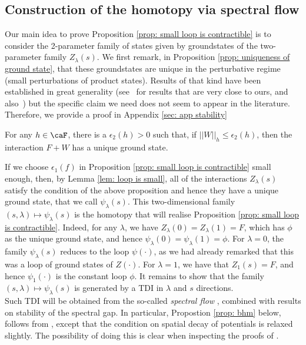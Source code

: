 \subsection{Construction of the homotopy via spectral flow}\label{sec: homotopy from spectral flow}
Our main idea to prove Proposition \ref{prop: small loop is contractible} is to consider the 2-parameter family of states given by  groundstates of the two-parameter family $Z_\lambda(s)$. We first remark, in Proposition \ref{prop: uniqueness of ground state}, that these groundstates are unique in the perturbative regime (small perturbations of product states). Results of that kind have been established in great generality (see~\cite{nachtergaele2020quasi} for results that are very close to ours, and also~\cite{yarotsky2006ground,bravyi2010topological,michalakis2013stability, roeck2017exponentially,del2021lie}) but the specific claim we need does not seem to appear in the literature. Therefore, we provide a proof in Appendix \ref{sec: app stability}
\begin{proposition}\label{prop: uniqueness of ground state}
	For any $h\in\caF$, there is a $\epsilon_2(h)>0$ such that, if $||W||_h \leq \epsilon_2(h)$, then 
	the interaction $F+W$ has a unique ground state. 
\end{proposition} 
If we choose $\epsilon_1(f)$ in Proposition \ref{prop: small loop is contractible} small enough, then, by Lemma \ref{lem: loop is small}, all of the 
interactions $Z_{\lambda}(s)$ satisfy the condition of the above proposition and hence they have a unique ground state, that we call $\psi_\lambda(s)$. This two-dimensional family  $(s,\lambda)\mapsto \psi_\lambda(s)$ is the  homotopy that will realise Proposition \ref{prop: small loop is contractible}. Indeed, for any $\lambda$, we have $Z_{\lambda}(0)=Z_{\lambda}(1)=F$, which has $\phi$ as the unique ground state, and hence $\psi_\lambda(0)=\psi_\lambda(1)=\phi$. 
For $\lambda=0$, the family $\psi_\lambda(s)$ reduces to the loop $\psi(\cdot)$, as we had already remarked that this was a loop of ground states of $Z(\cdot)$.
For $\lambda=1$, we have that $Z_1(s)=F$, and hence $\psi_1(\cdot)$ is the constant loop $\phi$. It remains to show that the family $(s,\lambda)\mapsto \psi_\lambda(s)$ is generated by a TDI in $\lambda$ and $s$ directions.\\ Such TDI will be obtained from the so-called \emph{spectral flow} \cite{hastings2005quasiadiabatic,bachmann2012automorphic,moon2020automorphic}, combined with  results on stability of the spectral gap. In particular, Propostion \ref{prop: bhm} below, follows from \cite{nachtergaele2020quasi}, except that the condition on spatial decay of potentials is relaxed slightly. The possibility of doing this is clear when inspecting the proofs of \cite{nachtergaele2020quasi}.
